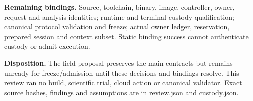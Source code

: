 \documentclass[11pt]{article}
\begin{document}
\textbf{Remaining bindings.} Source, toolchain, binary, image, controller, owner, request and analysis identities; runtime and terminal-custody qualification; canonical protocol validation and freeze; actual owner ledger, reservation, prepared session and context subset. Static binding success cannot authenticate custody or admit execution.

\textbf{Disposition.} The field proposal preserves the main contracts but remains unready for freeze/admission until these decisions and bindings resolve. This review ran no build, scientific trial, cloud action or canonical validator. Exact source hashes, findings and assumptions are in review.json and custody.json.
\end{document}

